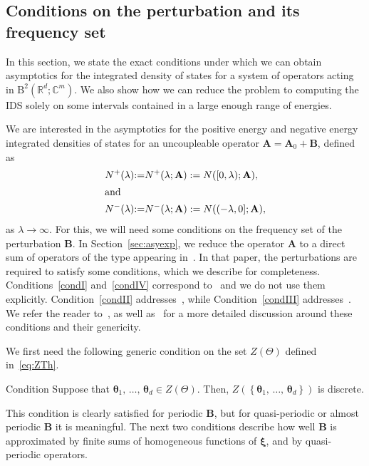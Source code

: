 \documentclass[AHL,Unicode,longabstracts,published]{cedram}
\newcommand{\RB}{\mathrm{B}}
\newcommand{\R}{\mathbb R}
\newcommand{\C}{\mathbb C}
\newcommand{\btheta}{\boldsymbol \theta}
\newcommand{\bxi}{\boldsymbol \xi}
\newcommand{\BA}{\mathbf A}
\newcommand{\BB}{\mathbf B}
\newcommand{\pd}{uncoupleable}
\newcommand{\set}[1]{\left\{ #1 \right\}}
\begin{document}
\subsection{Conditions on the perturbation and its frequency set}\label{sec:prelim}

In this section, we state the exact conditions under which we can obtain asymptotics for the integrated density of states for a system of operators acting in $\RB^2(\R^d;\C^m)$. We also show how we can reduce the problem to computing the IDS solely on some intervals contained in a large enough range of energies.


We are interested in the asymptotics for the positive energy and negative energy integrated densities of states for an \pd{} operator $\BA = \BA_0 + \BB$, defined as
\begin{align}
N^+(\lambda) &{:=} N^+(\lambda;\BA) := N([0,\lambda);\BA),\label{eq:npositive}
\\
\intertext{and}
N^-(\lambda) &{:=} N^-(\lambda;\BA) := N((-\lambda,0];\BA),\label{eq:nnegative}
\end{align}
as $\lambda \to \infty$. For this, we will need some conditions on the frequency set of the perturbation $\BB$. In Section~\ref{sec:asyexp}, we reduce the operator $\BA$ to a direct sum of operators of the type appearing in~\cite{MorParSht2014}. In that paper, the perturbations are required to satisfy some conditions, which we describe for completeness. Conditions~\ref{condI} and~\ref{condIV} correspond to~\cite[Conditions~A and~C]{MorParSht2014} and we do not use them explicitly. Condition~\ref{condII} addresses~\cite[equation 2.4]{MorParSht2014}, while Condition~\ref{condIII} addresses~\cite[Condition~B]{MorParSht2014}. We refer the reader to~\cite{MorParSht2014}, as well as~\cite{ParSht2012} for a more detailed discussion around these conditions and their genericity.

We first need the following generic condition on the set $Z(\Theta)$ defined in~\eqref{eq:ZTh}.

\begin{enonce}
{Condition}\label{condI}
Suppose that $\btheta_1,\,\dotsc,\,\btheta_d \in Z(\Theta)$. Then, $Z(\set{\btheta_1,\,\dotsc,\,\btheta_d})$ is discrete.
\end{enonce}

This condition is clearly satisfied for periodic $\BB$, but for quasi-periodic or almost periodic $\BB$ it is meaningful. The next two conditions describe how well $\BB$ is approximated by finite sums of homogeneous functions of $\bxi$, and by quasi-periodic operators.
\end{document}
